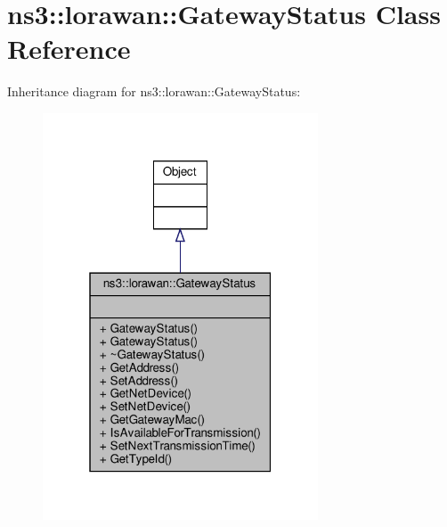 \hypertarget{classns3_1_1lorawan_1_1GatewayStatus}{}\section{ns3\+:\+:lorawan\+:\+:Gateway\+Status Class Reference}
\label{classns3_1_1lorawan_1_1GatewayStatus}


Inheritance diagram for ns3\+:\+:lorawan\+:\+:Gateway\+Status\+:
\nopagebreak
\begin{figure}[H]
\begin{center}
\leavevmode
\includegraphics[width=232pt]{classns3_1_1lorawan_1_1GatewayStatus__inherit__graph}
\end{center}
\end{figure}



